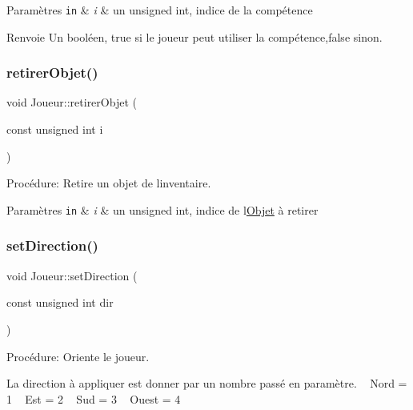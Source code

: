 \begin{DoxyParams}[1]{Paramètres}
\mbox{\tt in}  & {\em i} & un unsigned int, indice de la compétence \\
\hline
\end{DoxyParams}
\begin{DoxyReturn}{Renvoie}
Un booléen, true si le joueur peut utiliser la compétence,false sinon. 
\end{DoxyReturn}
\mbox{\label{classJoueur_a3bc7264efba044ad356416dcfea263ed}} 
\subsubsection{\texorpdfstring{retirer\+Objet()}{retirerObjet()}}
{\footnotesize\ttfamily void Joueur\+::retirer\+Objet (\begin{DoxyParamCaption}\item[{const unsigned int}]{i }\end{DoxyParamCaption})}



Procédure\+: Retire un objet de l\textquotesingle{}inventaire. 


\begin{DoxyParams}[1]{Paramètres}
\mbox{\tt in}  & {\em i} & un unsigned int, indice de l\textquotesingle{}\mbox{\hyperlink{structObjet}{Objet}} à retirer \\
\hline
\end{DoxyParams}
\mbox{\label{classJoueur_a873b075ff9fe84219a5208765022b06b}} 
\subsubsection{\texorpdfstring{set\+Direction()}{setDirection()}}
{\footnotesize\ttfamily void Joueur\+::set\+Direction (\begin{DoxyParamCaption}\item[{const unsigned int}]{dir }\end{DoxyParamCaption})}



Procédure\+: Oriente le joueur. 

La direction à appliquer est donner par un nombre passé en paramètre. ~\newline
Nord = 1 ~\newline
Est = 2 ~\newline
Sud = 3 ~\newline
Ouest = 4 ~\newline


